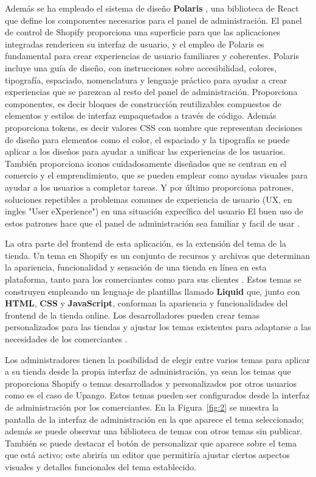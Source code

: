 \documentclass[12pt]{article}
\begin{document}
Además se ha empleado el sistema de diseño \textbf{Polaris} \cite{polaris}, una biblioteca de React que define los componentes necesarios para el panel de administración.
El panel de control de Shopify proporciona una superficie para que las aplicaciones integradas rendericen su interfaz de usuario, y el empleo de Polaris
es fundamental para crear experiencias de usuario familiares y coherentes.
Polaris incluye una guía de diseño, con instrucciones sobre accesibilidad, colores, tipografía, espaciado, nomenclatura y lenguaje práctico para ayudar 
a crear experiencias que se parezcan al resto del panel de administración. Proporciona componentes, es decir bloques de construcción reutilizables compuestos de 
elementos y estilos de interfaz empaquetados a través de código. Además proporciona tokens, es decir valores CSS con nombre que representan decisiones
de diseño para elementos como el color, el espaciado y la tipografía se puede aplicar a los diseños para ayudar a unificar las experiencias de los usuarios.
También proporciona iconos cuidadosamente diseñados que se centran en el comercio y el emprendimiento, que se pueden emplear como ayudas visuales para ayudar a los 
usuarios a completar tareas. Y por último proporciona patrones, soluciones repetibles a problemas comunes de experiencia de usuario (UX, en ingles "User eXperience") en una situación expecífica del usuario
El buen uso de estos patrones hace que el panel de administración sea familiar y facil de usar \cite{shopify-dev}.

La otra parte del frontend de esta aplicación, es la extensión del tema de la tienda. Un tema en Shopify es un conjunto de recursos
y archivos que determinan la apariencia, funcionalidad y sensación de una tienda en línea en esta plataforma, tanto para los comerciantes como para
sus clientes \cite{theme}. Estos temas se construyen empleando un lenguaje de plantillas llamado \textbf{Liquid} \cite{liquid} que, junto con \textbf{HTML}, \textbf{CSS} y \textbf{JavaScript}, conforman la apariencia
y funcionalidades del frontend de la tienda online. Los desarrolladores pueden crear temas personalizados para las tiendas y ajustar los temas existentes 
para adaptarse a las necesidades de los comerciantes \cite{shopify-dev}. 

Los administradores tienen la posibilidad de elegir entre varios temas para aplicar a su tienda desde la propia interfaz de administración,
ya sean los temas que proporciona Shopify o temas desarrollados y personalizados por otros usuarios como es el caso de Upango. Estos temas pueden ser
configurados desde la interfaz de administración por los comerciantes.
En la Figura~\ref{fig:2} se muestra la pantalla de la interfaz de administración en la que aparece el tema seleccionado; además se puede observar una 
biblioteca de temas con otros temas sin publicar. También se puede destacar el botón de personalizar que aparece
sobre el tema que está activo; este abriría un editor que permitiría ajustar ciertos aspectos visuales y detalles funcionales del tema establecido.
\end{document}
